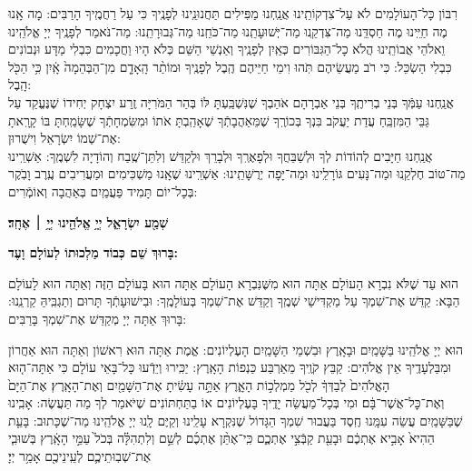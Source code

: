 רִבּוֹן כָּל־הָעוֹלָמִים לֹא עַל־צִדְקוֹתֵֽינוּ אֲנַֽחְנוּ מַפִּילִים תַּחֲנוּנֵֽינוּ לְפָנֶֽיךָ כִּי עַל רַחֲמֶֽיךָ הָרַבִּים: מָה אָֽנוּ מֶה חַיֵּֽינוּ מֶה חַסְדֵּֽנוּ מַה־צִּדְקֵֽנוּ מַה־יְּשׁוּעָתֵֽנוּ מַה־כֹּחֵֽנוּ מַה־גְּבוּרָתֵֽנוּ: מַה־נֹּאמַר לְפָנֶֽיךָ יְיָ אֱלֹהֵֽינוּ וֵאלֹהֵי אֲבוֹתֵֽינוּ הֲלֹא כָל־הַגִּבּוֹרִים כְּאַֽיִן לְפָנֶֽיךָ וְאַנְשֵׁי הַשֵּׁם כְּלֹא הָיוּ וַחֲכָמִים כִּבְלִי מַדָּע וּנְבוֹנִים כִּבְלִי הַשְׂכֵּל: כִּי רֹב מַעֲשֵׂיהֶם תֹּֽהוּ וִימֵי חַיֵּיהֶם הֶֽבֶל לְפָנֶֽיךָ וּמוֹתַ֨ר הָֽאָדָ֤ם מִן־הַבְּהֵמָה֙ אָֽ֔יִן כִּ֥י הַכֹּ֖ל הָֽבֶל: \\
אֲנַֽחְנוּ עַמְּֿךָ בְּנֵי בְרִיתֶֽךָ בְּנֵי אַבְרָהָם אֹהַבְךָ שֶׁנִּשְׁבַּֽעְתָּ לּוֹ בְּהַר הַמֹּרִיָּה זֶֽרַע יִצְחָק יְחִידוֹ שֶׁנֶּעֱקַד עַל גַּבֵּי הַמִּזְבֵּֽחַ עֲדַת יַעֲקֹב בִּנְךָ בְּכוֹרֶֽךָ שֶׁמֵּאַהֲבָתְֿךָ שֶׁאָהַֽבְתָּ אֹתוֹ וּמִשִּׂמְחָתְֿךָ שֶׁשָּׂמַֽחְתָּ בּוֹ קָרָֽאתָ אֶת־שְׁמוֹ יִשְׂרָאֵל וִישֻׁרוּן: \\ 
אֲנַֽחְנוּ חַיָּבִים לְהוֹדוֹת לְךָ וּלְשַׁבֵּחֲךָ וּלְפָאֶרְֽךָ וּלְבָרֵךְ וּלְקַדֵּשׁ וְלִתֵּן־שֶֽׁבַח וְהוֹדָיָה לִשְׁמֶֽךָ: אַשְׁרֵֽינוּ מַה־טּוֹב חֶלְקֵֽנוּ וּמַה־נָּעִים גּוֹרָלֵֽינוּ וּמַה־יָּפָה יְרֻשָּׁתֵֽינוּ: אַשְׁרֵֽינוּ שֶׁאָֽנוּ מַשְׁכִּימִים וּמַעֲרִיבִים עֶֽרֶב וָבֹֽקֶר בְּכָל־יוֹם תָּמִיד פַּעֲמַֽיִם בְּאַהֲבָה וְאוֹמְֿרִים:

\begin{Large}
\textbf{שְׁמַ֖ע יִשְׂרָאֵ֑ל יְיָ֥ אֱלֹהֵ֖ינוּ יְיָ֥ ׀ אֶחָֽד׃}
\end{Large}

\textbf{%
בָּרוּךְ שֵׁם כְּבוֹד מַלְכוּתוֹ לְעוֹלָם וָעֶד:
}


הוּא עַד שֶׁלֹּא נִבְרָא הָעוֹלָם אַתָּה הוּא מִשֶּׁנִּבְרָא הָעוֹלָם אַתָּה הוּא בָּעוֹלָם הַזֶּה וְאַתָּה הוּא לָעוֹלָם הַבָּא: קַדֵּשׁ אֶת־שִׁמְךָ עַל מַקְדִּישֵׁי שְׁמֶֽךָ וְקַדֵּשׁ אֶת־שִׁמְךָ בְּעוֹלָמֶֽךָ: וּבִישׁוּעָתְֿךָ תָּרוּם וְתַגְבִּֽיהַּ קַרְנֵֽנוּ: בָּרוּךְ אַתָּה יְיָ מְקַדֵּשׁ אֶת־שִׁמְךָ בָּרַבִּים:
 
הוּא יְיָ אֱלֹהֵֽינוּ בַּשָּׁמַֽיִם וּבָאָֽרֶץ וּבִשְׁמֵי הַשָּׁמַֽיִם הָעֶלְיוֹנִים: אֱמֶת אַתָּה הוּא רִאשׁוֹן וְאַתָּה הוּא אַחֲרוֹן וּמִבַּלְעָדֶֽיךָ אֵין אֱלֹהִים: קַבֵּץ קֹוֶֽיךָ מֵאַרְבַּע כַּנְפוֹת הָאָֽרֶץ: יַכִּֽירוּ וְיֵדְֿעוּ כָּל־בָּאֵי עוֹלָם כִּי אַתָּה־ה֤וּא הָאֱלֹהִים֙ לְבַדְּךָ֔ לְכֹ֖ל מַמְלְכ֣וֹת הָאָ֑רֶץ אַתָּ֣ה עָשִׂ֔יתָ אֶת־הַשָּׁמַ֖יִם וְאֶת־הָאָֽרֶץ׃ אֶת־הַיָּם֙ וְאֶת־כׇּל־אֲשֶׁר־בָּ֔ם׃ וּמִי בְּכָל־מַעֲשֵׂה יָדֶֽיךָ בָּעֶלְיוֹנִים אוֹ בַתַּחְתּוֹנִים שֶׁיֹּאמַר לְךָ מַה תַּעֲשֶׂה: אָבִֽינוּ שֶׁבַּשָּׁמַֽיִם עֲשֵׂה עִמָּֽנוּ חֶֽסֶד בַּעֲבוּר שִׁמְךָ הַגָּדוֹל שֶׁנִּקְרָא עָלֵֽינוּ וְקַיֶּם לָֽנוּ יְיָ אֱלֹהֵֽינוּ מַה־שֶׁכָּתוּב: בָּעֵ֤ת הַהִיא֙ אָבִ֣יא אֶתְכֶ֔ם וּבָעֵ֖ת קַבְּֿצִ֣י אֶתְכֶ֑ם כִּֽי־אֶתֵּ֨ן אֶתְכֶ֜ם לְשֵׁ֣ם וְלִתְהִלָּ֗ה בְּכֹל֙ עַמֵּ֣י הָאָֽ֔רֶץ בְּשׁוּבִ֧י אֶת־שְׁבֽוּתֵיכֶ֛ם לְעֵֽינֵיכֶ֖ם אָמַ֥ר יְיָ׃



